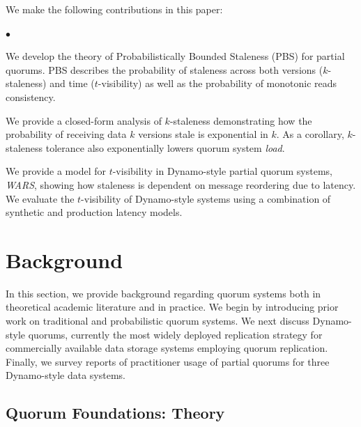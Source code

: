 \documentclass{vldb}
\newcommand{\sectionskip}{-0em}
\newcommand{\subsectionskip}{-0em}
\newenvironment{myitemize}
{
   \vspace{0em}
    \begin{list}{$\bullet$ }{}
        \setlength{\topsep}{0em}
        \setlength{\parskip}{0pt}
        \setlength{\partopsep}{0pt}
        \setlength{\parsep}{0pt}         
        \setlength{\itemsep}{.5em} 
}
{
    \end{list} 
    \vspace{-.5em}
}
\begin{document}
We make the following contributions in this paper:

\begin{myitemize}

\item We develop the theory of Probabilistically Bounded Staleness
  (PBS) for partial quorums. PBS describes the probability of
  staleness across both versions ($k$-staleness) and time
  ($t$-visibility) as well as the probability of monotonic reads
  consistency.

\item We provide a closed-form analysis of $k$-staleness demonstrating
  how the probability of receiving data $k$ versions stale is
  exponential in $k$.  As a corollary, $k$-staleness tolerance also
  exponentially lowers quorum system \textit{load}.

\item We provide a model for $t$-visibility in Dynamo-style partial
  quorum systems, \textit{WARS}, showing how staleness is dependent on
  message reordering due to latency.  We evaluate the $t$-visibility
  of Dynamo-style systems using a combination of synthetic and
  production latency models.

\end{myitemize}

\vspace{\sectionskip}\section{Background}
\label{sec:background}

In this section, we provide background regarding quorum systems both
in theoretical academic literature and in practice.  We begin by
introducing prior work on traditional and probabilistic quorum
systems.  We next discuss Dynamo-style quorums, currently the most
widely deployed replication strategy for commercially available data
storage systems employing quorum replication.  Finally, we survey
reports of practitioner usage of partial quorums for three
Dynamo-style data systems.

\vspace{\subsectionskip}\subsection{Quorum Foundations: Theory}
\end{document}
